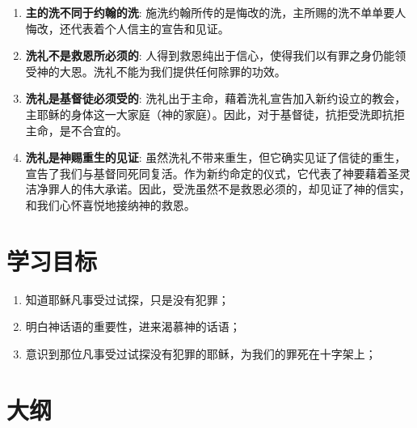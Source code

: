 \begin{enumerate}
  \begin{enumerate}
    \item \textbf{主的洗不同于约翰的洗}: 施洗约翰所传的是悔改的洗，主所赐的洗不单单要人悔改，还代表着个人信主的宣告和见证。
    \item \textbf{洗礼不是救恩所必须的}: 人得到救恩纯出于信心，使得我们以有罪之身仍能领受神的大恩。洗礼不能为我们提供任何除罪的功效。
    \item \textbf{洗礼是基督徒必须受的}: 洗礼出于主命，藉着洗礼宣告加入新约设立的教会，主耶稣的身体这一大家庭（神的家庭）。因此，对于基督徒，抗拒受洗即抗拒主命，是不合宜的。
    \item \textbf{洗礼是神赐重生的见证}: 虽然洗礼不带来重生，但它确实见证了信徒的重生，宣告了我们与基督同死同复活。作为新约命定的仪式，它代表了神要藉着圣灵洁净罪人的伟大承诺。因此，受洗虽然不是救恩必须的，却见证了神的信实，和我们心怀喜悦地接纳神的救恩。
  \end{enumerate}
\end{enumerate}

\section{学习目标}

\begin{enumerate}
  \item 知道耶稣凡事受过试探，只是没有犯罪；
  \item 明白神话语的重要性，进来渴慕神的话语；
  \item 意识到那位凡事受过试探没有犯罪的耶稣，为我们的罪死在十字架上；
\end{enumerate}

\section{大纲}


